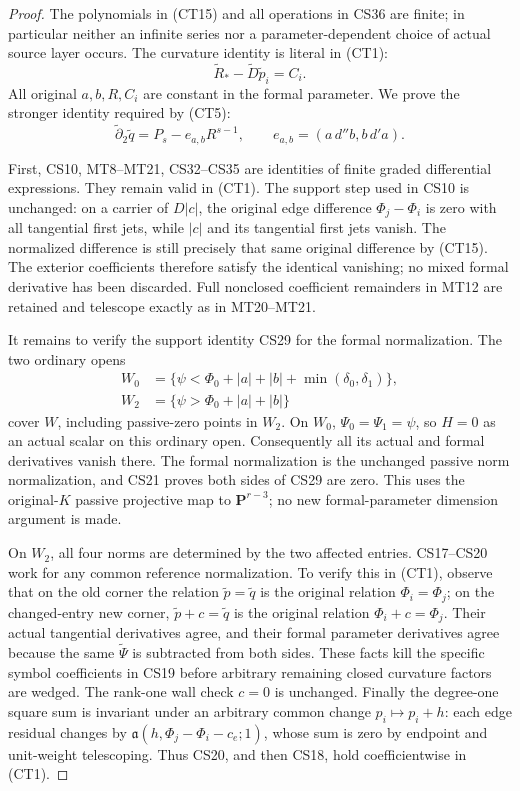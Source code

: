 \begin{proof}
The polynomials in (CT15) and all operations in CS36 are finite;
in particular neither an infinite series nor a parameter-dependent
choice of actual source layer occurs.  The curvature identity is
literal in (CT1):
\[
             \widetilde R_*-\widetilde D\widetilde p_i=C_i.
 \tag{CT16}
\]
All original $a,b,R,C_i$ are constant in the formal parameter.
We prove the stronger identity required by (CT5):
\[
        \widetilde\partial_2\widetilde q
                      =P_s-e_{a,b}R^{s-1},\qquad
        e_{a,b}=(a\,d''b,b\,d'a).
 \tag{CT17}
\]

First, CS10, MT8--MT21, CS32--CS35 are identities of finite
graded differential expressions.  They remain valid in (CT1).
The support step used in CS10 is unchanged: on a carrier of
$D|c|$, the original edge difference $\Phi_j-\Phi_i$ is zero
with all tangential first jets, while $|c|$ and its tangential
first jets vanish.  The normalized difference is still precisely
that same original difference by (CT15).  The exterior coefficients
therefore satisfy the identical vanishing; no mixed formal derivative
has been discarded.  Full nonclosed coefficient remainders in MT12
are retained and telescope exactly as in MT20--MT21.

It remains to verify the support identity CS29 for the formal
normalization.  The two ordinary opens
\[
 \begin{split}
 W_0&=\{\psi<\Phi_0+|a|+|b|+\min(\delta_0,\delta_1)\},\\
 W_2&=\{\psi>\Phi_0+|a|+|b|\}
 \end{split}
 \tag{CT18}
\]
cover $W$, including passive-zero points in $W_2$.  On $W_0$,
$\Psi_0=\Psi_1=\psi$, so $H=0$ as an actual scalar on this
ordinary open.  Consequently all its actual and formal derivatives
vanish there.  The formal normalization is the unchanged passive
norm normalization, and CS21 proves both sides of CS29 are zero.
This uses the original-$K$ passive projective map to
$\mathbf P^{r-3}$; no new formal-parameter dimension argument
is made.

On $W_2$, all four norms are determined by the two affected entries.
CS17--CS20 work for any common reference normalization.  To verify
this in (CT1), observe that on the old corner the relation
$\widetilde p=\widetilde q$ is the original relation $\Phi_i=\Phi_j$;
on the changed-entry new corner,
$\widetilde p+c=\widetilde q$ is the original relation
$\Phi_i+c=\Phi_j$.  Their actual tangential derivatives agree,
and their formal parameter derivatives agree because the same
$\widetilde\Psi$ is subtracted from both sides.  These facts kill
the specific symbol coefficients in CS19 before arbitrary remaining
closed curvature factors are wedged.  The rank-one wall check
$c=0$ is unchanged.  Finally the degree-one square sum is invariant
under an arbitrary common change $p_i\mapsto p_i+h$: each edge
residual changes by $\mathfrak a(h,\Phi_j-\Phi_i-c_e;1)$,
whose sum is zero by endpoint and unit-weight telescoping.
Thus CS20, and then CS18, hold coefficientwise in (CT1).


\end{proof}

